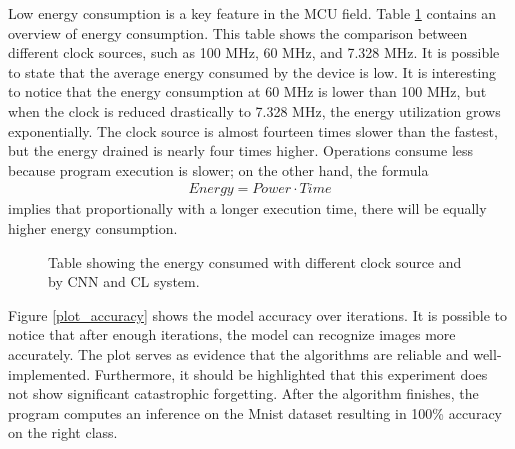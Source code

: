\singlespacing

\quad Low energy consumption is a key feature in the MCU field. Table \ref{energy_consume} contains an overview of energy consumption. This table shows the comparison between different clock sources, such as 100 MHz, 60 MHz, and 7.328 MHz. It is possible to state that the average energy consumed by the device is low. It is interesting to notice that the energy consumption at 60 MHz is lower than 100 MHz, but when the clock is reduced drastically to 7.328 MHz, the energy utilization grows exponentially. The clock source is almost fourteen times slower than the fastest, but the energy drained is nearly four times higher. Operations consume less because program execution is slower; on the other hand, the formula 
\begin{gather*}
   Energy = Power \cdot Time
\end{gather*}
\quad implies that proportionally with a longer execution time, there will be equally higher energy consumption.

\begin{figure}[!ht]
\centerline{}
\caption{Table showing the energy consumed with different clock source and by CNN and CL system.}
\label{energy_consume}
\end{figure}

\singlespacing

\quad Figure \ref{plot_accuracy} shows the model accuracy over iterations. It is possible to notice that after enough iterations, the model can recognize images more accurately. The plot serves as evidence that the algorithms are reliable and well-implemented. Furthermore, it should be highlighted that this experiment does not show significant catastrophic forgetting. After the algorithm finishes, the program computes an inference on the Mnist dataset resulting in 100\% accuracy on the right class.

